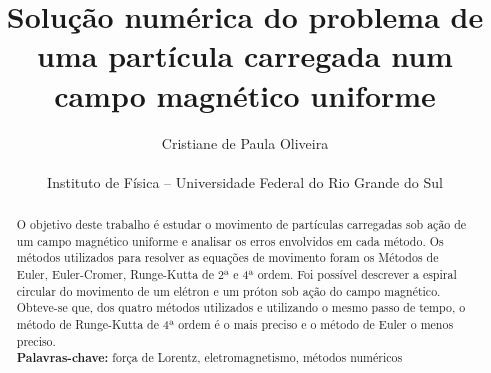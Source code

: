 \documentclass[brazilian, 12pt, a4paper, final]{article}
\title{\textbf{Solução numérica do problema de uma partícula carregada num campo magnético uniforme}}
\author{Cristiane de Paula Oliveira\\\\\small{Instituto de Física -- Universidade Federal do Rio Grande do Sul}}
\begin{document}
\maketitle

\begin{abstract}
  \noindent
  O objetivo deste trabalho é estudar o movimento de partículas carregadas sob ação de um campo magnético uniforme e analisar os erros envolvidos em cada método. Os métodos utilizados para resolver as equações de movimento foram os Métodos de Euler, Euler-Cromer, Runge-Kutta de 2ª e 4ª ordem. Foi possível descrever a espiral circular do movimento de um elétron e um próton sob ação do campo magnético. Obteve-se que, dos quatro métodos utilizados e utilizando o mesmo passo de tempo, o método de Runge-Kutta de 4ª ordem é o mais preciso e o método de Euler o menos preciso. \\
 
  \textbf{Palavras-chave:} força de Lorentz, eletromagnetismo, métodos numéricos
\end{abstract}
\end{document}
